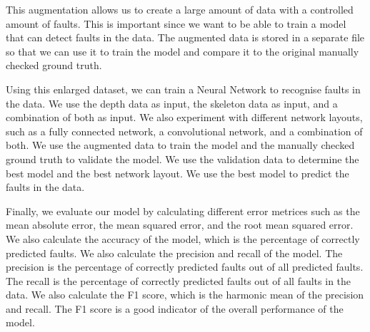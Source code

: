 This augmentation allows us to create a large amount of data with a controlled amount of faults. This is important since we want to be able to train a model that can detect faults in the data. The augmented data is stored in a separate file so that we can use it to train the model and compare it to the original manually checked ground truth.

Using this enlarged dataset, we can train a Neural Network to recognise faults in the data. We use the depth data as input, the skeleton data as input, and a combination of both as input. We also experiment with different network layouts, such as a fully connected network, a convolutional network, and a combination of both. We use the augmented data to train the model and the manually checked ground truth to validate the model. We use the validation data to determine the best model and the best network layout. We use the best model to predict the faults in the data. 

Finally, we evaluate our model by calculating different error metrices such as the mean absolute error, the mean squared error, and the root mean squared error. We also calculate the accuracy of the model, which is the percentage of correctly predicted faults. We also calculate the precision and recall of the model. The precision is the percentage of correctly predicted faults out of all predicted faults. The recall is the percentage of correctly predicted faults out of all faults in the data. We also calculate the F1 score, which is the harmonic mean of the precision and recall. The F1 score is a good indicator of the overall performance of the model.
